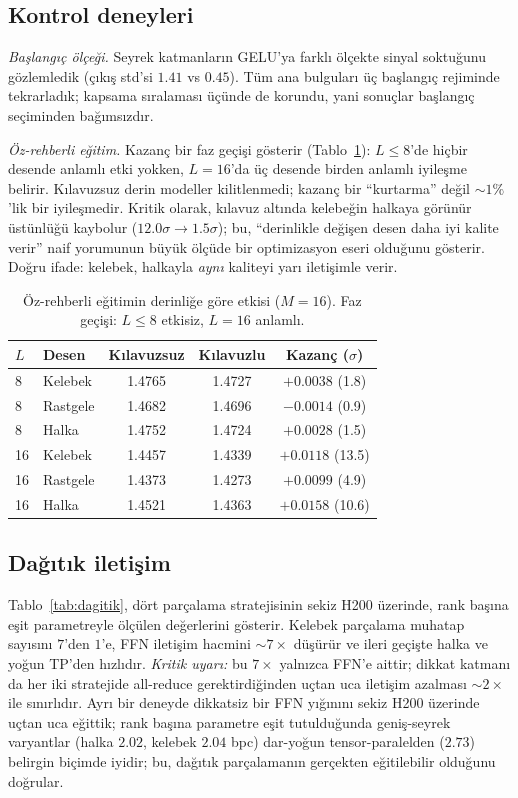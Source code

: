 \documentclass[10pt,journal]{IEEEtran}
\begin{document}
\subsection{Kontrol deneyleri}
\emph{Başlangıç ölçeği.} Seyrek katmanların GELU'ya farklı ölçekte sinyal soktuğunu gözlemledik
(çıkış std'si $1.41$ vs $0.45$). Tüm ana bulguları üç başlangıç rejiminde tekrarladık; kapsama
sıralaması üçünde de korundu, yani sonuçlar başlangıç seçiminden bağımsızdır.

\emph{Öz-rehberli eğitim.} Kazanç bir faz geçişi gösterir (Tablo~\ref{tab:kilavuz}): $L\le 8$'de
hiçbir desende anlamlı etki yokken, $L{=}16$'da üç desende birden anlamlı iyileşme belirir.
Kılavuzsuz derin modeller kilitlenmedi; kazanç bir ``kurtarma'' değil $\sim\!1\%$'lik bir
iyileşmedir. Kritik olarak, kılavuz altında kelebeğin halkaya görünür üstünlüğü kaybolur
($12.0\sigma \to 1.5\sigma$); bu, ``derinlikle değişen desen daha iyi kalite verir'' naif
yorumunun büyük ölçüde bir optimizasyon eseri olduğunu gösterir. Doğru ifade: kelebek, halkayla
\emph{aynı} kaliteyi yarı iletişimle verir.

\begin{table}[!t]
\centering
\footnotesize
\caption{Öz-rehberli eğitimin derinliğe göre etkisi ($M{=}16$). Faz geçişi: $L\le8$ etkisiz,
$L{=}16$ anlamlı.}
\label{tab:kilavuz}
\begin{tabular}{@{}llccc@{}}
\toprule
$L$ & Desen & Kılavuzsuz & Kılavuzlu & Kazanç ($\sigma$) \\
\midrule
8  & Kelebek  & 1.4765 & 1.4727 & $+0.0038$ (1.8) \\
8  & Rastgele & 1.4682 & 1.4696 & $-0.0014$ (0.9) \\
8  & Halka    & 1.4752 & 1.4724 & $+0.0028$ (1.5) \\
16 & Kelebek  & 1.4457 & 1.4339 & $+0.0118$ (13.5) \\
16 & Rastgele & 1.4373 & 1.4273 & $+0.0099$ (4.9)  \\
16 & Halka    & 1.4521 & 1.4363 & $+0.0158$ (10.6) \\
\bottomrule
\end{tabular}
\end{table}

\subsection{Dağıtık iletişim}
Tablo~\ref{tab:dagitik}, dört parçalama stratejisinin sekiz H200 üzerinde, rank başına eşit
parametreyle ölçülen değerlerini gösterir. Kelebek parçalama muhatap sayısını $7$'den $1$'e,
FFN iletişim hacmini $\sim\!7\times$ düşürür ve ileri geçişte halka ve yoğun TP'den hızlıdır.
\emph{Kritik uyarı:} bu $7\times$ yalnızca FFN'e aittir; dikkat katmanı da her iki stratejide
all-reduce gerektirdiğinden uçtan uca iletişim azalması $\sim\!2\times$ ile sınırlıdır. Ayrı
bir deneyde dikkatsiz bir FFN yığınını sekiz H200 üzerinde uçtan uca eğittik; rank başına
parametre eşit tutulduğunda geniş-seyrek varyantlar (halka $2.02$, kelebek $2.04$ bpc)
dar-yoğun tensor-paralelden ($2.73$) belirgin biçimde iyidir; bu, dağıtık parçalamanın
gerçekten eğitilebilir olduğunu doğrular.
\end{document}
